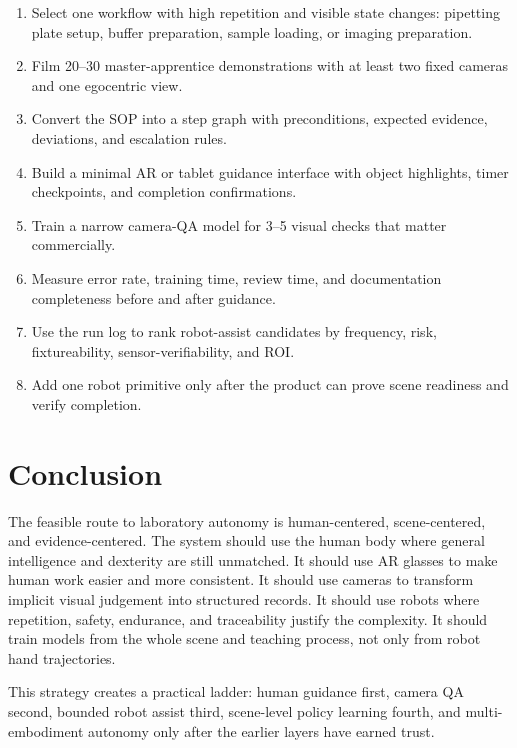 \documentclass[11pt]{article}
\begin{document}
\begin{enumerate}
  \item Select one workflow with high repetition and visible state changes: pipetting plate setup, buffer preparation, sample loading, or imaging preparation.
  \item Film 20--30 master-apprentice demonstrations with at least two fixed cameras and one egocentric view.
  \item Convert the SOP into a step graph with preconditions, expected evidence, deviations, and escalation rules.
  \item Build a minimal AR or tablet guidance interface with object highlights, timer checkpoints, and completion confirmations.
  \item Train a narrow camera-QA model for 3--5 visual checks that matter commercially.
  \item Measure error rate, training time, review time, and documentation completeness before and after guidance.
  \item Use the run log to rank robot-assist candidates by frequency, risk, fixtureability, sensor-verifiability, and ROI.
  \item Add one robot primitive only after the product can prove scene readiness and verify completion.
\end{enumerate}

\section{Conclusion}

The feasible route to laboratory autonomy is human-centered, scene-centered, and evidence-centered. The system should use the human body where general intelligence and dexterity are still unmatched. It should use AR glasses to make human work easier and more consistent. It should use cameras to transform implicit visual judgement into structured records. It should use robots where repetition, safety, endurance, and traceability justify the complexity. It should train models from the whole scene and teaching process, not only from robot hand trajectories.

This strategy creates a practical ladder: human guidance first, camera QA second, bounded robot assist third, scene-level policy learning fourth, and multi-embodiment autonomy only after the earlier layers have earned trust.
\end{document}
